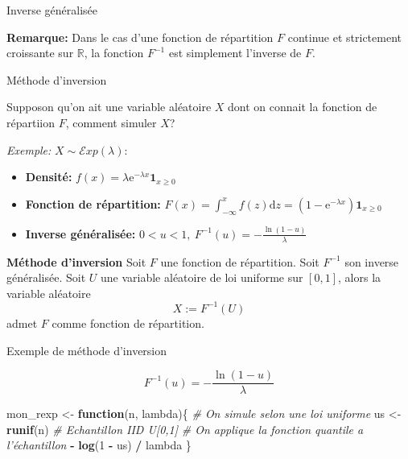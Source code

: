 \documentclass[ignorenonframetext,]{beamer}
\newenvironment{Shaded}{\begin{snugshade}}{\end{snugshade}}
\newcommand{\CommentTok}[1]{\textcolor[rgb]{0.56,0.35,0.01}{\textit{#1}}}
\newcommand{\ControlFlowTok}[1]{\textcolor[rgb]{0.13,0.29,0.53}{\textbf{#1}}}
\newcommand{\DecValTok}[1]{\textcolor[rgb]{0.00,0.00,0.81}{#1}}
\newcommand{\KeywordTok}[1]{\textcolor[rgb]{0.13,0.29,0.53}{\textbf{#1}}}
\newcommand{\NormalTok}[1]{#1}
\newcommand{\OperatorTok}[1]{\textcolor[rgb]{0.81,0.36,0.00}{\textbf{#1}}}
\newcommand{\StringTok}[1]{\textcolor[rgb]{0.31,0.60,0.02}{#1}}
\providecommand{\tightlist}{%
  \setlength{\itemsep}{0pt}\setlength{\parskip}{0pt}}
\newcommand{\R}{\mathbb{R}}
\begin{document}
\begin{frame}{Inverse généralisée}
\protect\hypertarget{inverse-guxe9nuxe9ralisuxe9e}{}

\textbf{Remarque:} Dans le cas d'une fonction de répartition \(F\)
continue et strictement croissante sur \(\R\), la fonction \(F^{-1}\)
est simplement l'inverse de \(F\).

\end{frame}

\begin{frame}{Méthode d'inversion}
\protect\hypertarget{muxe9thode-dinversion-1}{}

Supposon qu'on ait une variable aléatoire \(X\) dont on connait la
fonction de répartiion \(F\), comment simuler \(X\)?\pause

\emph{Exemple:} \(X\sim \mathcal{E}xp(\lambda)\):

\begin{itemize}
\tightlist
\item
  \textbf{Densité:}
  \(f(x) = \lambda\text{e}^{-\lambda x}\mathbf{1}_{x \geq 0}\) \pause
\item
  \textbf{Fonction de répartition: }
  \(F(x) = \int_{-\infty}^x f(z)\text{d}z = (1 - \text{e}^{-\lambda x})\mathbf{1}_{x \geq 0}\)
  \pause
\item
  \textbf{Inverse généralisée: }
  \(0<u<1,~F^{-1}(u) = -\frac{\ln (1-u)}{\lambda}\) \pause
\end{itemize}

\textbf{Méthode d'inversion} Soit \(F\) une fonction de répartition.
Soit \(F^{-1}\) son inverse généralisée. Soit \(U\) une variable
aléatoire de loi uniforme sur \([0, 1]\), alors la variable aléatoire
\[X := F^{-1}(U)\] admet \(F\) comme fonction de répartition.

\end{frame}

\begin{frame}[fragile]{Exemple de méthode d'inversion}
\protect\hypertarget{exemple-de-muxe9thode-dinversion}{}

\[F^{-1}(u) = -\frac{\ln (1-u)}{\lambda}\]

\begin{Shaded}
\begin{Highlighting}[]
\NormalTok{mon_rexp <-}\StringTok{ }\ControlFlowTok{function}\NormalTok{(n, lambda)\{}
  \CommentTok{# On simule selon une loi uniforme}
\NormalTok{  us <-}\StringTok{ }\KeywordTok{runif}\NormalTok{(n) }\CommentTok{# Echantillon IID U[0,1]}
  \CommentTok{# On applique la fonction quantile a l'échantillon}
  \OperatorTok{-}\StringTok{ }\KeywordTok{log}\NormalTok{(}\DecValTok{1} \OperatorTok{-}\StringTok{ }\NormalTok{us) }\OperatorTok{/}\StringTok{ }\NormalTok{lambda}
\NormalTok{\}}
\end{Highlighting}
\end{Shaded}

\end{frame}
\end{document}

